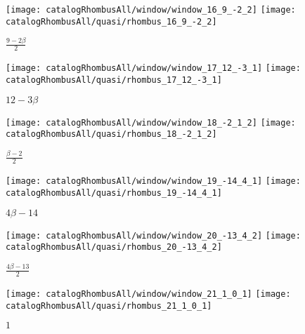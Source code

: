 \documentclass[text.tex]{subfiles}
\begin{document}
\begin{landscape}
\begin{figure}[h]
\centering
\texttt{[image: catalogRhombusAll/window/window\_16\_9\_-2\_2]}
\texttt{[image: catalogRhombusAll/quasi/rhombus\_16\_9\_-2\_2]}
\caption*{$\frac{9-2\beta}{2}$}
\end{figure}

\begin{figure}[h]
\centering
\texttt{[image: catalogRhombusAll/window/window\_17\_12\_-3\_1]}
\texttt{[image: catalogRhombusAll/quasi/rhombus\_17\_12\_-3\_1]}
\caption*{$12-3\beta$}
\end{figure}

\begin{figure}[h]
\centering
\texttt{[image: catalogRhombusAll/window/window\_18\_-2\_1\_2]}
\texttt{[image: catalogRhombusAll/quasi/rhombus\_18\_-2\_1\_2]}
\caption*{$\frac{\beta-2}{2}$}
\end{figure}

\begin{figure}[h]
\centering
\texttt{[image: catalogRhombusAll/window/window\_19\_-14\_4\_1]}
\texttt{[image: catalogRhombusAll/quasi/rhombus\_19\_-14\_4\_1]}
\caption*{$4\beta-14$}
\end{figure}

\begin{figure}[h]
\centering
\texttt{[image: catalogRhombusAll/window/window\_20\_-13\_4\_2]}
\texttt{[image: catalogRhombusAll/quasi/rhombus\_20\_-13\_4\_2]}
\caption*{$\frac{4\beta-13}{2}$}
\end{figure}

\begin{figure}[h]
\centering
\texttt{[image: catalogRhombusAll/window/window\_21\_1\_0\_1]}
\texttt{[image: catalogRhombusAll/quasi/rhombus\_21\_1\_0\_1]}
\caption*{$1$}
\end{figure}

\end{landscape}
\thispagestyle{empty}
\end{document}
